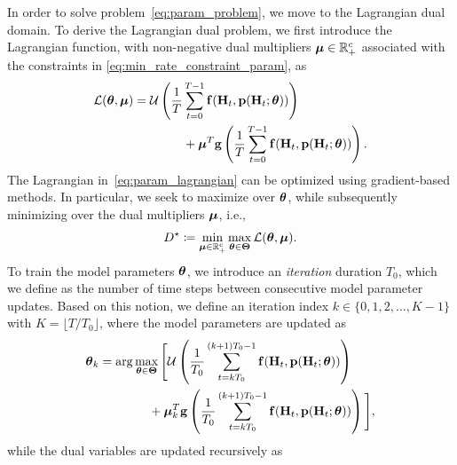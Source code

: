 \documentclass[lettersize,journal]{IEEEtran}
\begin{document}
In order to solve problem~\eqref{eq:param_problem}, we move to the Lagrangian dual domain. To derive the Lagrangian dual problem, we first introduce the Lagrangian function, with non-negative dual multipliers $\boldsymbol{\mu} \in {\mathbb R}_+^c$ associated with the constraints in \eqref{eq:min_rate_constraint_param}, as
%
\begin{align}
   {\ensuremath{\mathcal L}}(\boldsymbol{\theta}, \boldsymbol{\mu}) &= \mathcal{U}\left( \frac{1}{T} \sum_{t=0}^{T-1} {\mathbf f}({\mathbf H}_t, {\mathbf p}({\mathbf H}_t;\boldsymbol{\theta})) \right)\nonumber \\
   &\qquad\qquad+ \boldsymbol{\mu}^T {\mathbf g}\left( \frac{1}{T} \sum_{t=0}^{T-1} {\mathbf f}({\mathbf H}_t, {\mathbf p}({\mathbf H}_t;\boldsymbol{\theta})) \right).\label{eq:param_lagrangian}
\end{align}
%
The Lagrangian in~\eqref{eq:param_lagrangian} can be optimized using gradient-based methods. In particular, we seek to maximize over $\boldsymbol{\theta}$, while subsequently minimizing over the dual multipliers $\boldsymbol{\mu}$, i.e.,
%
\begin{align}\label{eq_dual_problem}
D^{\star} \coloneqq \min_{\boldsymbol{\mu} \in {\mathbb R}_+^c} \max_{\boldsymbol{\theta} \in \boldsymbol{\Theta}} {\mathcal L}(\boldsymbol{\theta},\boldsymbol{\mu}).
\end{align}
%
To train the model parameters $\boldsymbol{\theta}$, we introduce an \emph{iteration} duration $T_0$, which we define as the number of time steps between consecutive model parameter updates. Based on this notion, we define an iteration index $k\in\{0,1,2,\dots,K-1\}$ with $K=\lfloor T / T_0 \rfloor$, where the model parameters are updated as
\begin{align}
\boldsymbol{\theta}_k &= \arg \max_{\boldsymbol{\theta}\in\boldsymbol{\Theta}} \Bigg[\mathcal{U}\left( \frac{1}{T_0} \sum_{t=kT_0}^{(k+1)T_0-1} {\mathbf f}({\mathbf H}_{t}, {\mathbf p}({\mathbf H}_{t};\boldsymbol{\theta})) \right)\nonumber \\
  &\qquad\qquad+ \boldsymbol{\mu}_{k}^T {\mathbf g}\left( \frac{1}{T_0} \sum_{t=kT_0}^{(k+1)T_0-1} {\mathbf f}({\mathbf H}_{t}, {\mathbf p}({\mathbf H}_{t};\boldsymbol{\theta})) \right)\Bigg],\label{eq:theta_dynamics}
\end{align}
while the dual variables are updated recursively 
as
\end{document}
